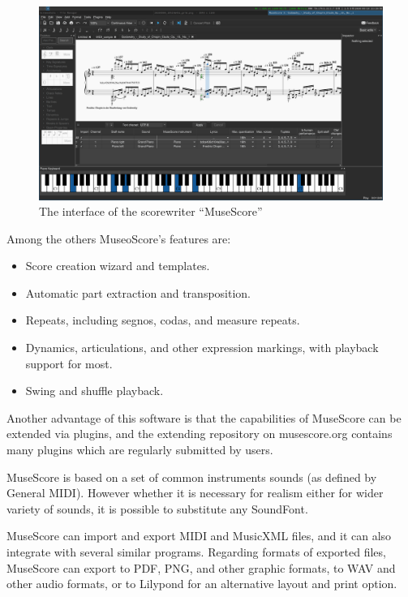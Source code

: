 \documentclass[thesis=B,english]{FITthesis}[2019/12/23]
\begin{document}
\begin{figure}[ht]
            \includegraphics[width=\textwidth]{Musescore.png}
            \caption[MuseScore user interface]{The interface of the scorewriter “MuseScore” \cite{MuseScore}}
            \label{fig:Musescore}
\end{figure}

Among the others MuseoScore's features are:
\begin{itemize}
\item Score creation wizard and templates.
\item Automatic part extraction and transposition.
\item Repeats, including segnos, codas, and measure repeats.
\item Dynamics, articulations, and other expression markings, with playback support for most.
\item Swing and shuffle playback.
\end{itemize}

Another advantage of this software is that the capabilities of MuseScore can be extended via plugins, and the extending repository on musescore.org contains many plugins which are regularly submitted by users.

MuseScore is based on a set of common instruments sounds (as defined by General MIDI). However whether it is necessary for realism either for wider variety of sounds, it is possible to substitute any SoundFont.

MuseScore can import and export MIDI and MusicXML files, and it can also integrate with several similar programs. Regarding formats of exported files, MuseScore can export to PDF, PNG, and other graphic formats, to WAV and other audio formats, or to Lilypond for an alternative layout and print option.
\end{document}
